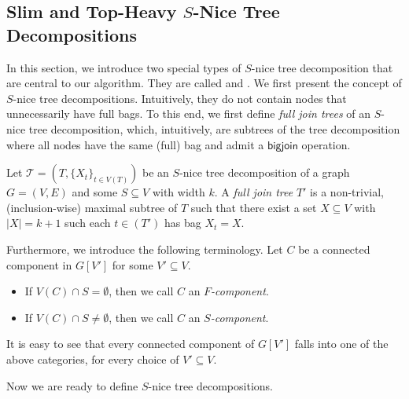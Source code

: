 \documentclass[a4paper,UKenglish,cleveref, autoref, thm-restate, numberwithinsect]{lipics-v2021}
\newcounter{algorithm}
\newcommand{\bigjoin}{\mathsf{bigjoin}}
\newcommand{\slim}{\text{slim}\xspace}
\newcommand{\topheavy}{\text{top-heavy}\xspace}
\begin{document}
\subsection{Slim and Top-Heavy \boldmath$S$-Nice Tree Decompositions}
\label{sec:useful}

In this section, we introduce two special types of $S$-nice tree decomposition that are central to our algorithm. They are called \emph{\slim} and \emph{\topheavy}.  We first present the concept of \slim $S$-nice tree decompositions. Intuitively, they do not contain nodes that unnecessarily have full bags. To this end, we first define \emph{full join trees} of an $S$-nice tree decomposition, which, intuitively, are subtrees of the tree decomposition where all nodes have the same (full) bag and admit a $\bigjoin$ operation.

\begin{definition}\label{def:fulljointree}
Let $\mathcal{T}=(T,\{X_t\}_{t\in V(T)})$ be an $S$-nice tree decomposition of a graph $G=(V,E)$ and some $S\subseteq V$ with width $k$. 
A \emph{full join tree} $T'$ is a non-trivial, (inclusion-wise) maximal subtree of $T$ such that there exist a set $X\subseteq V$ with $|X|=k+1$ such each $t\in (T')$ has bag $X_t=X$.
\end{definition}
Furthermore, we introduce the following terminology. 
Let $C$ be a connected component in $G[V']$ for some $V'\subseteq V$. 
\begin{itemize}
    \item If $V(C)\cap S=\emptyset$, then we call $C$ an \emph{$F$-component}. \item If $V(C)\cap S\neq\emptyset$, then we call $C$ an \emph{$S$-component}.
\end{itemize}
It is easy to see that every connected component of $G[V']$ falls into one of the above categories, for every choice of $V'\subseteq V$. 

Now we are ready to define \emph{\slim} $S$-nice tree decompositions.
\end{document}
